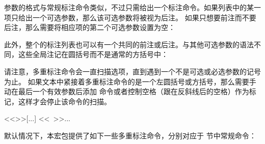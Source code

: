 \begin{ltxexample}
\parencites[35]{key1}[88--120]{key2}[23]{key3}
\end{ltxexample}
%
参数的格式与常规标注命令类似，不过只需给出一个标注命令。如果列表中的某一项只给出一个可选参数，那么该可选参数将被视为后注。
如果只想要前注而不要后注，那么需要将相应项的第二个可选参数设置为空：

\begin{ltxexample}
\parencites[35]{key1}[chapter 2 in][]{key2}[23]{key3}
\end{ltxexample}
%
此外，整个的标注列表也可以有一个共同的前注或后注。与其他可选参数的语法不同，这些全局注记在圆括号而不是通常的方括号中：

%
请注意，多重标注命令会一直扫描选项，直到遇到一个不是可选或必选参数的记号为止。
如果文本中紧接着多重标注命令的是一个左圆括号或方括号，那么需要手动在最后一个有效参数后添加  命令或者控制空格（跟在反斜线后的空格）作为标记，这样才会停止该命令的扫描。

\begin{ltxexample}[style=latex,showspaces]{}
\parencites[35]{key1}[78]{key2}<<\relax>>[...]
\parencites[35]{key1}[78]{key2}<<\ >>{...}
\end{ltxexample}
%
默认情况下，本宏包提供了如下一些多重标注命令，分别对应于  节中常规命令：

